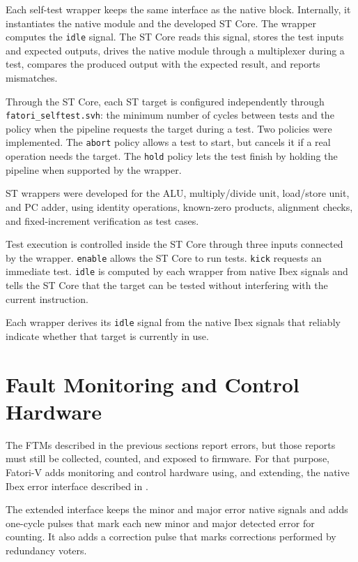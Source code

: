 Each self-test wrapper keeps the same interface as the native block. Internally, it instantiates the native module and the developed \ac{ST} Core. The wrapper computes the \texttt{idle} signal. The \ac{ST} Core reads this signal, stores the test inputs and expected outputs, drives the native module through a multiplexer during a test, compares the produced output with the expected result, and reports mismatches.

Through the \ac{ST} Core, each \ac{ST} target is configured independently through \texttt{fatori\_selftest.svh}: the minimum number of cycles between tests and the policy when the pipeline requests the target during a test. Two policies were implemented. The \texttt{abort} policy allows a test to start, but cancels it if a real operation needs the target. The \texttt{hold} policy lets the test finish by holding the pipeline when supported by the wrapper.

\ac{ST} wrappers were developed for the \ac{ALU}, multiply/divide unit, load/store unit, and \ac{PC} adder, using identity operations, known-zero products, alignment checks, and fixed-increment verification as test cases.

Test execution is controlled inside the \ac{ST} Core through three inputs connected by the wrapper. \texttt{enable} allows the \ac{ST} Core to run tests. \texttt{kick} requests an immediate test. \texttt{idle} is computed by each wrapper from native Ibex signals and tells the \ac{ST} Core that the target can be tested without interfering with the current instruction. 

Each wrapper derives its \texttt{idle} signal from the native Ibex signals that reliably indicate whether that target is currently in use.




\section{Fault Monitoring and Control Hardware}
\label{chap6:control_report}

The \acp{FTM} described in the previous sections report errors, but those reports must still be collected, counted, and exposed to firmware. For that purpose, \ac{Fatori-V} adds monitoring and control hardware using, and extending, the native Ibex error interface described in .

The extended interface keeps the minor and major error native signals and adds one-cycle pulses that mark each new minor and major detected error for counting. It also adds a correction pulse that marks corrections performed by redundancy voters.

